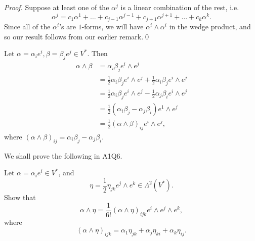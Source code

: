 \documentclass[notoc,notitlepage]{tufte-book}
\begin{document}
\begin{proof}
  Suppose at least one of the $\alpha^j$ is a linear combination of the rest, i.e.
  \begin{equation*}
    \alpha^j = c_1 \alpha^1 + \hdots + c_{j - 1} \alpha^{j - 1} +
      c_{j + 1} \alpha^{j + 1} + \hdots + c_k \alpha^k.
  \end{equation*}
  Since all of the $\alpha^i$'s are $1$-forms, we will have
  $\alpha^i \wedge \alpha^i$ in the wedge product, and so our result follows from
  our earlier remark.\qed\
\end{proof}

\begin{eg}
  Let $\alpha = \alpha_i e^i, \beta = \beta_j e^j \in V^*$. Then
  \begin{align*}
    \alpha \wedge \beta &= \alpha_i \beta_j e^i \wedge e^j \\
                        &= \frac{1}{2} \alpha_i \beta_j e^i \wedge e^j
                          + \frac{1}{2} \alpha_i \beta_j e^i \wedge e^j \\
                        &= \frac{1}{2} \alpha_i \beta_j e^i \wedge e^j
                          - \frac{1}{2} \alpha_j \beta_i e^i \wedge e^j \\
                        &= \frac{1}{2} (\alpha_i \beta_j - \alpha_j \beta_i)
                          e^1 \wedge e^j \\
                        &= \frac{1}{2} (\alpha \wedge \beta)_{ij} e^i \wedge e^j,
  \end{align*}
  where $(\alpha \wedge \beta)_{ij} = \alpha_i \beta_j - \alpha_j \beta_i$.
\end{eg}

We shall prove the following in A1Q6.

\begin{ex}
  Let $\alpha = \alpha_i e^i \in V^*$, and
  \begin{equation*}
    \eta = \frac{1}{2} \eta_{jk} e^j \wedge e^k \in \Lambda^2(V^*).
  \end{equation*}
  Show that
  \begin{equation*}
    \alpha \wedge \eta = \frac{1}{6!} (\alpha \wedge \eta)_{ijk} e^i \wedge e^j \wedge e^k,
  \end{equation*}
  where
  \begin{equation*}
    (\alpha \wedge \eta)_{ijk} = \alpha_1 \eta_{jk} + \alpha_j \eta_{ki} + \alpha_k \eta_{ij}.
  \end{equation*}
\end{ex}
\end{document}
